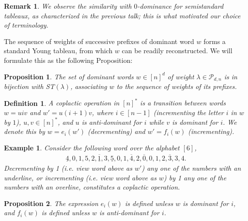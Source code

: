 \documentclass{article}
\newtheorem{prop}{Proposition}
\newtheorem{defn}{Definition}
\newtheorem{exmp}{Example}
\newtheorem{rem}{Remark}
\begin{document}
\begin{rem}
We observe the similarity with $0$-dominance for semistandard tableaux, as characterized in the previous talk; this is what motivated our choice of terminology.
\end{rem}
The sequence of weights of successive prefixes of dominant word $w$ forms a standard Young tableau, from which $w$ can be readily reconstructed. We will formulate this as the following Proposition:
\begin{prop}
The set of dominant words $w \in [n]^d$ of weight $\lambda \in \mathcal{P}_{d,n}$ is in bijection with ST$(\lambda)$, associating $w$ to the sequence of weights of its prefixes. 
\end{prop}
\begin{defn}
A coplactic operation in $[n]^*$ is a transition between words $w=uiv$ and $w'=u(i+1)v$, where $i \in [n-1]$ (incrementing the letter $i$ in $w$ by $1$), $u,v \in [n]^*$, and $u$ is anti-dominant for $i$ while $v$ is dominant for $i$. We denote this by $w=e_i(w')$ (decrementing) and $w'=f_i(w)$ (incrementing). 
\end{defn}
\begin{exmp}
Consider the following word over the alphabet $[6]$,
\begin{align}
 \underline{4},0,1,5,2,\overline{\underline{1}},3,\underline{5},0,1,\overline{4},2,\overline{0},0,1,2,\overline{3},3,4.
\end{align}
Decrementing by 1 (i.e. view word above as $w'$)
any one of the numbers with an underline, or incrementing (i.e. view word above as $w$) by 1 any one of the
numbers with an overline, constitutes a coplactic operation.
\end{exmp}
\begin{prop}
The expression $e_i(w)$ is defined unless $w$ is dominant for $i$, and $f_i(w)$ is defined unless $w$ is anti-dominant for $i$.
\end{prop}
\end{document}
